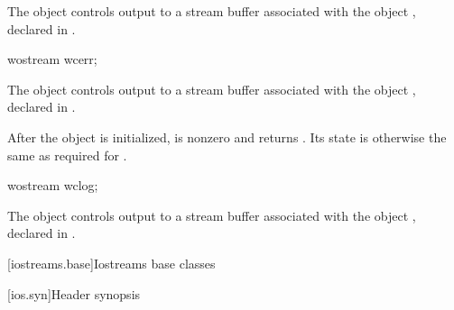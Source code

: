 \begin{itemdescr}
\pnum
The object 
controls output to a stream buffer associated with the object ,
declared in .
\end{itemdescr}

%
\begin{itemdecl}
wostream wcerr;
\end{itemdecl}

\begin{itemdescr}
\pnum
The object 
controls output to a stream buffer associated with the object ,
declared in .

\pnum
After the object
is initialized,
is nonzero and  returns .
Its state is otherwise the same as required for
.
\end{itemdescr}

%
\begin{itemdecl}
wostream wclog;
\end{itemdecl}

\begin{itemdescr}
\pnum
The object 
controls output to a stream buffer associated with the object ,
declared in .
\end{itemdescr}

[iostreams.base]{Iostreams base classes}

[ios.syn]{Header  synopsis}

